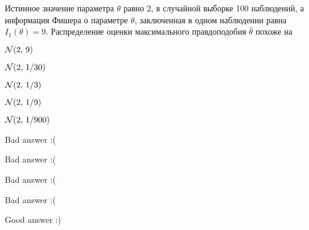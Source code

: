 
\begin{question}
Истинное значение параметра \(\theta\) равно \(2\), в случайной выборке
100 наблюдений, а информация Фишера о параметре \(\theta\), заключенная
в одном наблюдении равна \(I_1(\theta) = 9\). Распределение оценки
максимального правдоподобия \(\hat{\theta}\) похоже на
\begin{answerlist}
  \item \(\mathcal{N}(2, \, 9)\)
  \item \(\mathcal{N}(2, \, 1/30)\)
  \item \(\mathcal{N}(2, \, 1/3)\)
  \item \(\mathcal{N}(2, \, 1/9)\)
  \item \(\mathcal{N}(2, \, 1/900)\)
\end{answerlist}
\end{question}

\begin{solution}
\begin{answerlist}
  \item Bad answer :(
  \item Bad answer :(
  \item Bad answer :(
  \item Bad answer :(
  \item Good answer :)
\end{answerlist}
\end{solution}

